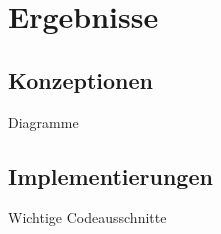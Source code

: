 \chapter{Ergebnisse}
\label{chap:ergebnisse}

\section{Konzeptionen}
Diagramme

\section{Implementierungen}
Wichtige Codeausschnitte
